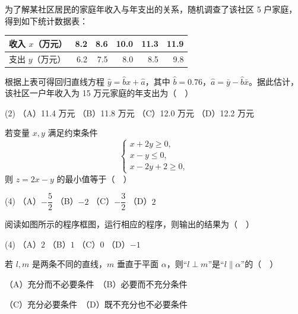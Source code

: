 \begin{question}
为了解某社区居民的家庭年收入与年支出的关系，随机调查了该社区 5 户家庭，得到如下统计数据表：

\begin{center}
\begin{tabular}{lrrrrr}
\toprule
收入 $x$（万元） & 8.2 & 8.6 & 10.0 & 11.3 & 11.9 \\
\midrule
支出 $y$（万元） & 6.2 & 7.5 & 8.0 & 8.5 & 9.8 \\
\bottomrule
\end{tabular}
\end{center}

根据上表可得回归直线方程 $\hat{y}=\hat{b}x+\hat{a}$，其中 $\hat{b}=0.76$，$\hat{a}=\bar{y}-\hat{b}\bar{x}$。据此估计，该社区一户年收入为 15 万元家庭的年支出为（　）

\begin{gkopts}(2)
\task （A）11.4 万元
\task （B）11.8 万元
\task （C）12.0 万元
\task （D）12.2 万元
\end{gkopts}

\end{question}
\begin{question}
若变量 $x,y$ 满足约束条件
\nopagebreak[4]
\[
\begin{cases}
x+2y\geqslant0,\\
x-y\leqslant0,\\
x-2y+2\geqslant0,
\end{cases}
\]
则 $z=2x-y$ 的最小值等于（　）

\begin{gkopts}(4)
\task （A）$-\dfrac52$
\task （B）$-2$
\task （C）$-\dfrac32$
\task （D）$2$
\end{gkopts}

\Needspace{0.4\textheight}
\end{question}
\begin{question}
阅读如图所示的程序框图，运行相应的程序，则输出的结果为（　）

\begin{gkopts}(4)
\task （A）$2$
\task （B）$1$
\task （C）$0$
\task （D）$-1$
\end{gkopts}
\nopagebreak[4]
\begin{center}\end{center}
\nopagebreak[4]
\end{question}
\begin{question}
若 $l,m$ 是两条不同的直线，$m$ 垂直于平面 $\alpha$，则“$l\perp m$”是“$l\parallel\alpha$”的（　）

（A）充分而不必要条件　（B）必要而不充分条件

（C）充分必要条件　（D）既不充分也不必要条件

\end{question}
